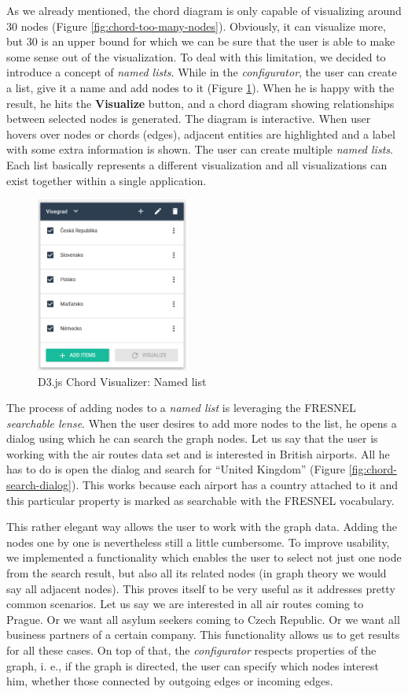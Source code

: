 As we already mentioned, the chord diagram is only capable of visualizing around 30 nodes (Figure \ref{fig:chord-too-many-nodes}). Obviously, it can visualize more, but 30 is an upper bound for which we can be sure that the user is able to make some sense out of the visualization. To deal with this limitation, we decided to introduce a concept of \emph{named lists}. While in the \emph{configurator}, the user can create a list, give it a name and add nodes to it (Figure \ref{fig:chord-named-list}). When he is happy with the result, he hits the \textbf{Visualize} button, and a chord diagram showing relationships between selected nodes is generated. The diagram is interactive. When user hovers over nodes or chords (edges), adjacent entities are highlighted and a label with some extra information is shown. The user can create multiple \emph{named lists}. Each list basically represents a different visualization and all visualizations can exist together within a single application.
\begin{figure}
	\centering
	\includegraphics[width=50mm]{img/06_chord_named_list.png}
	\caption{D3.js Chord Visualizer: Named list}
    \label{fig:chord-named-list}
\end{figure}

The process of adding nodes to a \emph{named list} is leveraging the FRESNEL \emph{searchable lense}. When the user desires to add more nodes to the  list, he opens a dialog using which he can search the graph nodes. Let us say that the user is working with the air routes data set and is interested in British airports. All he has to do is open the dialog and search for “United Kingdom” (Figure \ref{fig:chord-search-dialog}). This works because each airport has a country attached to it and this particular property is marked as searchable with the FRESNEL vocabulary.

This rather elegant way allows the user to work with the graph data. Adding the nodes one by one is nevertheless still a little cumbersome. To improve usability, we implemented a functionality which enables the user to select not just one node from the search result, but also all its related nodes (in graph theory we would say all adjacent nodes). This proves itself to be very useful as it addresses pretty common scenarios. Let us say we are interested in all air routes coming to Prague. Or we want all asylum seekers coming to Czech Republic. Or we want all business partners of a certain company. This functionality allows us to get results for all these cases. On top of that, the \emph{configurator} respects properties of the graph, i. e., if the graph is directed, the user can specify which nodes interest him, whether those connected by outgoing edges or incoming edges.

